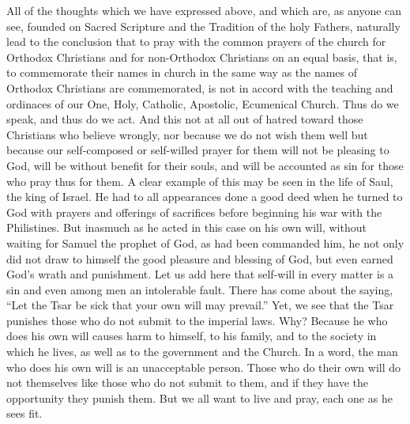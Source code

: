 All of the thoughts which we have expressed above, and which are, as anyone can see, founded on Sacred Scripture and the Tradition of the holy Fathers, naturally lead to the conclusion that to pray with the common prayers of the church for Orthodox Christians and for non-Orthodox Christians on an equal basis, that is, to commemorate their names in church in the same way as the names of Orthodox Christians are commemorated, is not in accord with the teaching and ordinaces of our One, Holy, Catholic, Apostolic, Ecumenical Church. Thus do we speak, and thus do we act. And this not at all out of hatred toward those Christians who believe wrongly, nor because we do not wish them well but because our self-composed or self-willed prayer for them will not be pleasing to God, will be without benefit for their souls, and will be accounted as sin for those who pray thus for them. A clear example of this may be seen in the life of Saul, the king of Israel. He had to all appearances done a good deed when he turned to God with prayers and offerings of sacrifices before beginning his war with the Philistines. But inasmuch as he acted in this case on his own will, without waiting for Samuel the prophet of God, as had been commanded him, he not only did not draw to himself the good pleasure and blessing of God, but even earned God's wrath and punishment. Let us add here that self-will in every matter is a sin and even among men an intolerable fault. There has come about the saying, ``Let the Tsar be sick that your own will may prevail.'' Yet, we see that the Tsar punishes those who do not submit to the imperial laws. Why? Because he who does his own will causes harm to himself, to his family, and to the society in which he lives, as well as to the government and the Church. In a word, the man who does his own will is an unacceptable person. Those who do their own will do not themselves like those who do not submit to them, and if they have the opportunity they punish them. But we all want to live and pray, each one as he sees fit.

